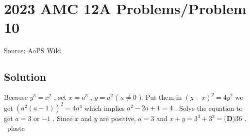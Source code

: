\documentclass[12pt]{article}
\begin{document}
\section*{{2023 AMC 12A Problems/Problem 10}}
Source: AoPS Wiki

\subsection*{Solution}
Because $y^3=x^2$ , set $x=a^3$ , $y=a^2$ ( $a\neq 0$ ). Put them in $(y-x)^2=4y^2$ we get $(a^2(a-1))^2=4a^4$ which implies $a^2-2a+1=4$ . Solve the equation to get $a=3$ or $-1$ . Since $x$ and $y$ are positive, $a=3$ and $x+y=3^3+3^2=\boxed{\textbf{(D)} 36}$ . ~plasta
\end{document}
